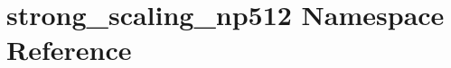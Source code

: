 \hypertarget{namespacestrong__scaling__np512}{}\section{strong\+\_\+scaling\+\_\+np512 Namespace Reference}
\label{namespacestrong__scaling__np512}
